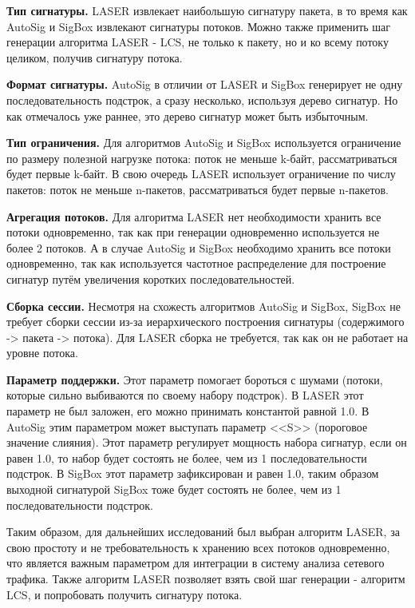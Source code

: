\textbf{Тип сигнатуры.} LASER извлекает наибольшую сигнатуру пакета, в то время как AutoSig и SigBox извлекают сигнатуры потоков.
Можно также применить шаг генерации алгоритма LASER - LCS, не только к пакету, но и ко всему потоку целиком, получив сигнатуру потока.

\textbf{Формат сигнатуры.} AutoSig в отличии от LASER и SigBox генерирует не одну последовательность подстрок,
а сразу несколько, используя дерево сигнатур.
Но как отмечалось уже раннее, это дерево сигнатур может быть избыточным.

\textbf{Тип ограничения.} Для алгоритмов AutoSig и SigBox используется ограничение по размеру полезной нагрузке потока:
поток не меньше k-байт, рассматриваться будет первые k-байт.
В свою очередь LASER использует ограничение по числу пакетов: поток не меньше n-пакетов, рассматриваться будет первые n-пакетов.

\textbf{Агрегация потоков.} Для алгоритма LASER нет необходимости хранить все потоки одновременно,
так как при генерации одновременно используется не более 2 потоков.
А в случае AutoSig и SigBox необходимо хранить все потоки одновременно,
так как используется частотное распределение для построение сигнатур путём увеличения коротких последовательностей.

\textbf{Сборка сессии.} Несмотря на схожесть алгоритмов AutoSig и SigBox,
SigBox не требует сборки сессии из-за иерархического построения сигнатуры (содержимого -> пакета -> потока).
Для LASER сборка не требуется, так как он не работает на уровне потока.

\textbf{Параметр поддержки.} Этот параметр помогает бороться с шумами (потоки, которые сильно выбиваются по своему набору подстрок).
В LASER этот параметр не был заложен, его можно принимать константой равной 1.0. В AutoSig этим параметром может выступать параметр <<S>> (пороговое значение слияния).
Этот параметр регулирует мощность набора сигнатур, если он равен 1.0, то набор будет состоять не более, чем из 1 последовательности подстрок.
В SigBox этот параметр зафиксирован и равен 1.0, таким образом
выходной сигнатурой SigBox тоже будет состоять не более, чем из 1 последовательности подстрок.

Таким образом, для дальнейших исследований был выбран алгоритм LASER, за свою простоту и не требовательность
к хранению всех потоков одновременно, что является важным параметром для интеграции в систему анализа сетевого трафика.
Также алгоритм LASER позволяет взять свой шаг генерации - алгоритм LCS, и попробовать получить сигнатуру потока.

